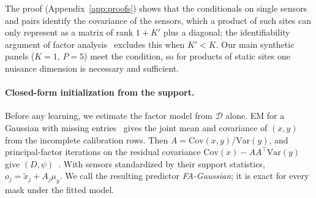 \documentclass{article}
\newcommand{\D}{\mathcal{D}}
\begin{document}
The proof (Appendix~\ref{app:proofs}) shows that the conditionals on single sensors and pairs identify the covariance
of the sensors, which a product of such sites can only represent as a matrix of rank $1+K'$ plus a diagonal; the
identifiability argument of factor analysis~\citep{anderson1956statistical} excludes this when $K'<K$. Our main
synthetic panels ($K=1$, $P=5$) meet the condition, so for products of static sites one nuisance dimension is
necessary and sufficient.

\paragraph{Closed-form initialization from the support.}
Before any learning, we estimate the factor model from $\D$ alone. EM for a Gaussian with missing
entries~\citep{dempster1977em,little2019statistical} gives the joint mean and covariance of $(x,y)$ from the incomplete
calibration rows. Then $A=\mathrm{Cov}(x,y)/\mathrm{Var}(y)$, and principal-factor iterations on the residual
covariance $\mathrm{Cov}(x)-AA^\top\mathrm{Var}(y)$ give $(D,\psi)$~\citep{rubin1982em,tipping1999ppca}. With sensors standardized by
their support statistics, $o_j=\tilde x_j+A_j\mu_y$. We call the resulting predictor \emph{FA-Gaussian}; it is exact
for every mask under the fitted model.
\end{document}
